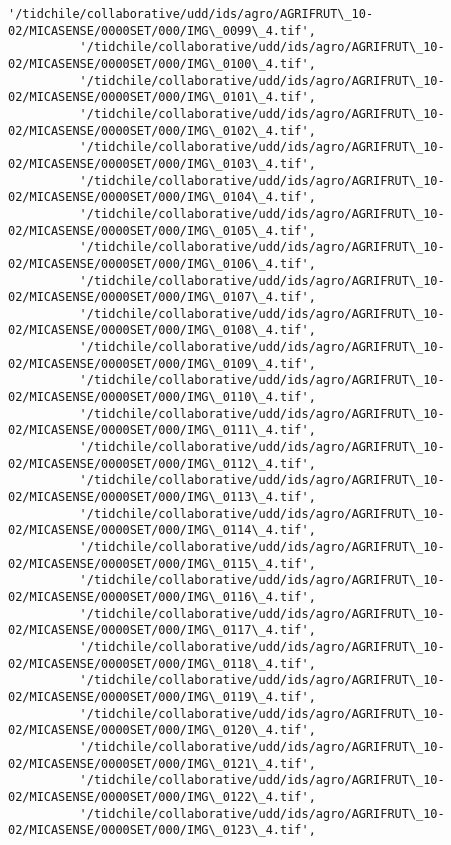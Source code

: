\documentclass[11pt]{article}
\begin{document}
\begin{Verbatim}[commandchars=\\\{\}]
          '/tidchile/collaborative/udd/ids/agro/AGRIFRUT\_10-02/MICASENSE/0000SET/000/IMG\_0099\_4.tif',
          '/tidchile/collaborative/udd/ids/agro/AGRIFRUT\_10-02/MICASENSE/0000SET/000/IMG\_0100\_4.tif',
          '/tidchile/collaborative/udd/ids/agro/AGRIFRUT\_10-02/MICASENSE/0000SET/000/IMG\_0101\_4.tif',
          '/tidchile/collaborative/udd/ids/agro/AGRIFRUT\_10-02/MICASENSE/0000SET/000/IMG\_0102\_4.tif',
          '/tidchile/collaborative/udd/ids/agro/AGRIFRUT\_10-02/MICASENSE/0000SET/000/IMG\_0103\_4.tif',
          '/tidchile/collaborative/udd/ids/agro/AGRIFRUT\_10-02/MICASENSE/0000SET/000/IMG\_0104\_4.tif',
          '/tidchile/collaborative/udd/ids/agro/AGRIFRUT\_10-02/MICASENSE/0000SET/000/IMG\_0105\_4.tif',
          '/tidchile/collaborative/udd/ids/agro/AGRIFRUT\_10-02/MICASENSE/0000SET/000/IMG\_0106\_4.tif',
          '/tidchile/collaborative/udd/ids/agro/AGRIFRUT\_10-02/MICASENSE/0000SET/000/IMG\_0107\_4.tif',
          '/tidchile/collaborative/udd/ids/agro/AGRIFRUT\_10-02/MICASENSE/0000SET/000/IMG\_0108\_4.tif',
          '/tidchile/collaborative/udd/ids/agro/AGRIFRUT\_10-02/MICASENSE/0000SET/000/IMG\_0109\_4.tif',
          '/tidchile/collaborative/udd/ids/agro/AGRIFRUT\_10-02/MICASENSE/0000SET/000/IMG\_0110\_4.tif',
          '/tidchile/collaborative/udd/ids/agro/AGRIFRUT\_10-02/MICASENSE/0000SET/000/IMG\_0111\_4.tif',
          '/tidchile/collaborative/udd/ids/agro/AGRIFRUT\_10-02/MICASENSE/0000SET/000/IMG\_0112\_4.tif',
          '/tidchile/collaborative/udd/ids/agro/AGRIFRUT\_10-02/MICASENSE/0000SET/000/IMG\_0113\_4.tif',
          '/tidchile/collaborative/udd/ids/agro/AGRIFRUT\_10-02/MICASENSE/0000SET/000/IMG\_0114\_4.tif',
          '/tidchile/collaborative/udd/ids/agro/AGRIFRUT\_10-02/MICASENSE/0000SET/000/IMG\_0115\_4.tif',
          '/tidchile/collaborative/udd/ids/agro/AGRIFRUT\_10-02/MICASENSE/0000SET/000/IMG\_0116\_4.tif',
          '/tidchile/collaborative/udd/ids/agro/AGRIFRUT\_10-02/MICASENSE/0000SET/000/IMG\_0117\_4.tif',
          '/tidchile/collaborative/udd/ids/agro/AGRIFRUT\_10-02/MICASENSE/0000SET/000/IMG\_0118\_4.tif',
          '/tidchile/collaborative/udd/ids/agro/AGRIFRUT\_10-02/MICASENSE/0000SET/000/IMG\_0119\_4.tif',
          '/tidchile/collaborative/udd/ids/agro/AGRIFRUT\_10-02/MICASENSE/0000SET/000/IMG\_0120\_4.tif',
          '/tidchile/collaborative/udd/ids/agro/AGRIFRUT\_10-02/MICASENSE/0000SET/000/IMG\_0121\_4.tif',
          '/tidchile/collaborative/udd/ids/agro/AGRIFRUT\_10-02/MICASENSE/0000SET/000/IMG\_0122\_4.tif',
          '/tidchile/collaborative/udd/ids/agro/AGRIFRUT\_10-02/MICASENSE/0000SET/000/IMG\_0123\_4.tif',

\end{Verbatim}
\end{document}
